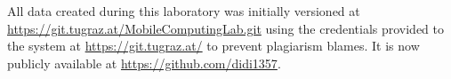 
%

\label{sec:appendix}
All data created during this laboratory was initially versioned at \url{https://git.tugraz.at/MobileComputingLab.git} using the credentials provided to the system at \url{https://git.tugraz.at/} to prevent plagiarism blames. It is now publicly available at \url{https://github.com/didi1357}.